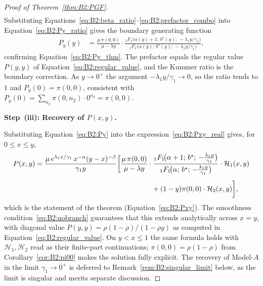 \begin{proof}[Proof of Theorem~\ref{thm:B2:PGF}]
\begin{align}
    \label{eq:B2:prefactor_combo}
\end{align}
Substituting Equations~\eqref{eq:B2:beta_ratio}--\eqref{eq:B2:prefactor_combo}
into Equation~\eqref{eq:B2:Py_ratio} gives the boundary generating function
\begin{align}
    P_y(y) &= \frac{\mu\,\pi(0,0)}{\mu-\lambda y}
    \cdot\frac{{}_1F_1\!\bigl(\alpha(y)+1;\,b^\star(y);\,-\lambda_1 y/\gamma_1\bigr)}
              {{}_1F_1\!\bigl(\alpha(y);\,b^\star(y);\,-\lambda_1 y/\gamma_1\bigr)},
    \label{eq:B2:Py}
\end{align}
confirming Equation~\eqref{eq:B2:Py_thm}.  The prefactor equals the regular value $P(y,y)$
of Equation~\eqref{eq:B2:regular_value}, and the Kummer ratio is the boundary correction.
As $y\to0^+$ the argument $-\lambda_1 y/\gamma_1\to0$, so the ratio tends to $1$ and
$P_y(0)=\pi(0,0)$, consistent with
$P_y(0)=\sum_{n_2}\pi(0,n_2)\cdot0^{n_2}=\pi(0,0)$.

\medskip\noindent\textbf{Step~(iii): Recovery of $P(x,y)$.}
\medskip

Substituting Equation~\eqref{eq:B2:Py} into the expression~\eqref{eq:B2:Pxy_real}
gives, for $0\le x\le y$,
\begin{align*}
    P(x,y) &= \frac{\mu\,e^{\lambda_1 x/\gamma_1}\,x^{-\alpha}(y-x)^{-\beta}}{\gamma_1 y}
    \biggl[
        \frac{\mu\,\pi(0,0)}{\mu-\lambda y}
        \cdot\frac{{}_1F_1\!\bigl(\alpha+1;\,b^\star;\,-\tfrac{\lambda_1 y}{\gamma_1}\bigr)}
                  {{}_1F_1\!\bigl(\alpha;\,b^\star;\,-\tfrac{\lambda_1 y}{\gamma_1}\bigr)}
        \cdot\mathcal{H}_1(x,y)
    \nonumber\\[4pt]
    &\hspace{5.8cm}
        + (1-y)\pi(0,0)\cdot\mathcal{H}_2(x,y)
    \biggr],
\end{align*}
which is the statement of the theorem (Equation~\eqref{eq:B2:Pxy}).
The smoothness condition~\eqref{eq:B2:nobranch} guarantees that this extends
analytically across $x=y$, with diagonal value
$P(y,y)=\rho(1-\rho)/(1-\rho y)$ as computed in Equation~\eqref{eq:B2:regular_value}.
On $y<x\le1$ the same formula holds with $\mathcal{H}_1,\mathcal{H}_2$ read as their
finite-part continuations; $\pi(0,0)=\rho(1-\rho)$ from Corollary~\ref{cor:B2:pi00} makes
the solution fully explicit.
The recovery of Model-$A$ in the limit $\gamma_1\to0^{+}$ is deferred to
Remark~\ref{rem:B2:singular_limit} below, as the limit is singular and merits
separate discussion.
\end{proof}

